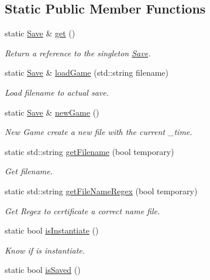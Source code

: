 \subsection*{Static Public Member Functions}
\begin{DoxyCompactItemize}
\item 
static \hyperlink{class_save}{Save} \& \hyperlink{class_save_a469d2ef2ac6a27eda2907e69ab033def}{get} ()
\begin{DoxyCompactList}\small\item\em Return a reference to the singleton \hyperlink{class_save}{Save}. \end{DoxyCompactList}\item 
static \hyperlink{class_save}{Save} \& \hyperlink{class_save_af278065bd4e223f0681f1e496dc61da6}{load\+Game} (std\+::string filename)
\begin{DoxyCompactList}\small\item\em Load filename to actual save. \end{DoxyCompactList}\item 
static \hyperlink{class_save}{Save} \& \hyperlink{class_save_aee5c805551d1a4492c3a44a3645343b6}{new\+Game} ()
\begin{DoxyCompactList}\small\item\em New Game create a new file with the current \+\_\+time. \end{DoxyCompactList}\item 
static std\+::string \hyperlink{class_save_ac33997c07a1209006b6b7edbcc6673a1}{get\+Filename} (bool temporary)
\begin{DoxyCompactList}\small\item\em Get filename. \end{DoxyCompactList}\item 
static std\+::string \hyperlink{class_save_a63783fbc06b4c10803b4551aacdde2c8}{get\+File\+Name\+Regex} (bool temporary)
\begin{DoxyCompactList}\small\item\em Get Regex to certificate a correct name file. \end{DoxyCompactList}\item 
static bool \hyperlink{class_save_a3427a3913b8a9e724c0a70de39e3799a}{is\+Instantiate} ()
\begin{DoxyCompactList}\small\item\em Know if is instantiate. \end{DoxyCompactList}\item 
static bool \hyperlink{class_save_a9efc33ad84705535d96b193d06426922}{is\+Saved} ()

\end{DoxyCompactItemize}
